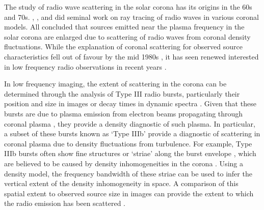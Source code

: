 The study of radio wave scattering in the solar corona has its origins in the 60s and 70s. \cite{Fokker1965}, \cite{Steinberg1971}, \cite{Stewart1972} and \cite{Riddle1974} did seminal work on ray tracing of radio waves in various coronal models. All concluded that sources emitted near the plasma frequency in the solar corona are enlarged due to scattering of radio waves from coronal density fluctuations. While the explanation of coronal scattering for observed source characteristics fell out of favour by the mid 1980s \citep{McLean1985}, it has seen renewed interested in low frequency radio observations in recent years  \citep{Thejappa2007,Thejappa2008,Kontar2017,Sharykin2018,Gordovskyy2019,Kontar2019}.

In low frequency imaging, the extent of scattering in the corona can be determined through the analysis of Type III radio bursts, particularly their position and size in images or decay times in dynamic spectra \citep[e.g.][]{Kontar2019, Gordovskyy2019, Krupar2018}. Given that these bursts are due to plasma emission from electron beams propagating through coronal plasma \citep[see][for a review]{Reid2014}, they provide a density diagnostic of such plasma. In particular, a subset of these bursts known as `Type IIIb' provide a diagnostic of scattering in coronal plasma due to density fluctuations from turbulence. For example, Type IIIb bursts often show fine structures or `striae' along the burst envelope \citep{Ellis1967,Ellis1969,DeLaNoe1972,DeLaNoe1975,Melnik2010b}, which are believed to be caused by density inhomogeneities in the corona \citep{Takakura1975}. Using a density model, the frequency bandwidth of these striae can be used to infer the vertical extent of the density inhomogeneity in space. A comparison of this spatial extent to observed source size in images can provide the extent to which the radio emission has been scattered \citep[e.g.][]{Kontar2017}.

